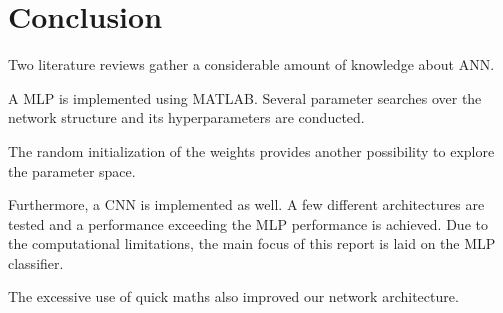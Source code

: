 \section{Conclusion}
     \pagestyle{mario}
     
Two literature reviews gather a considerable amount of knowledge about ANN.     

A MLP is implemented using MATLAB. Several parameter searches over the network structure and its hyperparameters are conducted.

The random initialization of the weights provides another possibility to explore the parameter space.

Furthermore, a CNN is implemented as well. A few different architectures are tested and a performance exceeding the MLP performance is achieved. Due to the computational limitations, the main focus of this report is laid on the MLP classifier.     
     
The excessive use of quick maths also improved our network architecture.